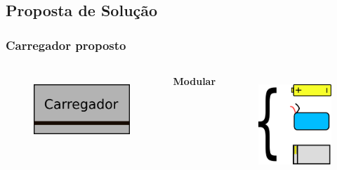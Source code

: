 \documentclass{beamer}
\begin{document}
	\subsection{Proposta de Solução}
	\begin{frame}\frametitle{Carregador proposto}
		
	\begin{columns}
			\centering
{} 
	\begin{figure}[h]
		\includegraphics[width=.8\textwidth]{charger2}
		\label{fig:charger2}		
	\end{figure}	\pause


	\pause
			\centering				
			\textbf{Modular} 
		\begin{figure}[h]

		\includegraphics[width=.8\textwidth]{module1}
		\label{fig:module1}		
	\end{figure}		
	\end{columns}	\pause


\end{frame}
\end{document}
